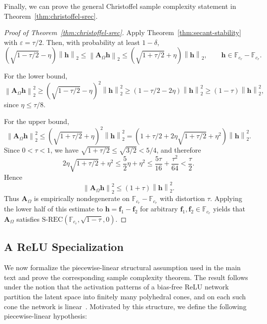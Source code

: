 \documentclass{article}
\theoremstyle{plain}
\theoremstyle{definition}
\theoremstyle{remark}
\begin{document}
Finally, we can prove the general Christoffel sample complexity statement in Theorem~\ref{thm:christoffel-srec}.

\begin{proof}[Proof of Theorem~\ref{thm:christoffel-srec}]
  Apply Theorem~\ref{thm:secant-stability} with $\varepsilon=\tau/2$. Then, with probability at least $1-\delta$,
  \[
    \left(\sqrt{1-\tau/2}-\eta\right)\left\|\mathbf{h}\right\|_2
    \leq
    \left\|\mathbf{A}_\Omega \mathbf{h}\right\|_2
    \leq
    \left(\sqrt{1+\tau/2}+\eta\right)\left\|\mathbf{h}\right\|_2,
    \qquad
    \mathbf{h}\in \mathbb{F}_{c_r}-\mathbb{F}_{c_r}.
  \]

  For the lower bound,
  \[
    \left\|\mathbf{A}_\Omega \mathbf{h}\right\|_2^2
    \geq
    \left(\sqrt{1-\tau/2}-\eta\right)^2\left\|\mathbf{h}\right\|_2^2
    \geq
    \left(1-\tau/2-2\eta\right)\left\|\mathbf{h}\right\|_2^2
    \geq
    \left(1-\tau\right)\left\|\mathbf{h}\right\|_2^2,
  \]
  since $\eta\leq \tau/8$.

  For the upper bound,
  \[
    \left\|\mathbf{A}_\Omega \mathbf{h}\right\|_2^2
    \leq
    \left(\sqrt{1+\tau/2}+\eta\right)^2\left\|\mathbf{h}\right\|_2^2
    =
    \left(
      1+\tau/2+2\eta\sqrt{1+\tau/2}+\eta^2
    \right)\left\|\mathbf{h}\right\|_2^2.
  \]
  Since $0<\tau<1$, we have $\sqrt{1+\tau/2}\leq \sqrt{3/2}<5/4$, and therefore
  \[
    2\eta\sqrt{1+\tau/2}+\eta^2
    \leq
    \frac{5}{2}\eta+\eta^2
    \leq
    \frac{5\tau}{16}+\frac{\tau^2}{64}
    <
    \frac{\tau}{2}.
  \]
  Hence
  \[
    \left\|\mathbf{A}_\Omega \mathbf{h}\right\|_2^2
    \leq
    \left(1+\tau\right)\left\|\mathbf{h}\right\|_2^2.
  \]
  Thus $\mathbf A_\Omega$ is empirically nondegenerate on $\mathbb F_{c_r}-\mathbb F_{c_r}$ with distortion $\tau$. Applying the lower half of this estimate to $\mathbf h=\mathbf f_1-\mathbf f_2$ for arbitrary $\mathbf f_1,\mathbf f_2\in\mathbb F_{c_r}$ yields that $\mathbf A_\Omega$ satisfies
  $
  \mathrm{S\text{-}REC}\left(\mathbb{F}_{c_r},\sqrt{1-\tau},0\right).
  $
\end{proof}


\subsection{A ReLU Specialization}\label{app:relu-specialization}

We now formalize the piecewise-linear structural assumption used in the main text and prove the corresponding sample complexity theorem. The result follows under the notion that the activation patterns of a bias-free ReLU network partition the latent space into finitely many polyhedral cones, and on each such cone the network is
linear~\cite{bora2017compressed, berk2023modeladapted, berk2022fourier, plan2025denoising, naderi2021beyond}. Motivated by this structure, we define the following piecewise-linear hypothesis:
\end{document}
